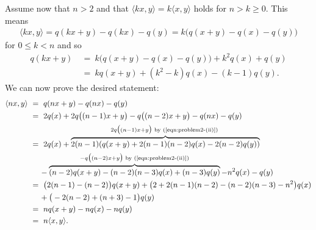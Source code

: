 \begin{homework}[e]
\begin{prf}
		Assume now that $n > 2$ and that $\langle kx,y\rangle = k\langle x,y\rangle$ holds for $n > k\geq 0$. This means
		\begin{align*}
			\langle kx,y\rangle = q(kx+y) - q(kx) - q(y) = k\big(q(x+y) - q(x) - q(y)\big)
		\end{align*}
		for $0 \leq k < n$ and so
		\begin{align*}\tag{$\ast$}\label{eqn:problem2-(ii)}
			q(kx + y) &~=~ k\big(q(x+y) - q(x) - q(y)\big) + k^2q(x) + q(y) \\
					  &~=~ kq(x+y) + (k^2 - k)q(x) - (k-1)q(y).
		\end{align*}
		We can now prove the desired statement:
		\begin{align*}
			\langle nx,y\rangle &~=~ q(nx + y) - q(nx) - q(y) \\
			  &~=~ 2q(x) + 2q\big((n-1)x + y\big) - q\big((n-2)x + y\big) - q(nx) - q(y) \\
			  &~=~ 2q(x) + \overbrace{2(n-1)(q(x+y)+2(n-1)(n-2)q(x) - 2(n-2)q(y))}^{2q\big((n-1)x + y\big) \text{ by (\ref{eqn:problem2-(ii)}) }} \\
			  &\hspace{1.5em} - \overbrace{(n-2)q(x+y) - (n-2)(n-3)q(x) + (n-3)q(y)}^{-q\big((n-2)x+y\big) \text{ by (\ref{eqn:problem2-(ii)})}} - n^2q(x) - q(y) \\
			  &~=~ \big(2(n-1) -(n-2)\big)q(x+y) +\big(2 + 2(n-1)(n-2)-(n-2)(n-3)-n^2\big)q(x) \\
			  &\hspace{1.5em}+ \big(-2(n-2)+(n+3)-1\big)q(y) \\
			  &~=~ nq(x+y) - nq(x) - nq(y) \\
			  &~=~ n\langle x,y\rangle.
		\end{align*}
        

\end{prf}
\end{homework}
